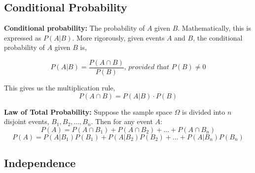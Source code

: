 \documentclass{article}
\begin{document}
\subsection{Conditional Probability}

\textbf{Conditional probability:} The probability of $A$ given $B$. Mathematically, this is expressed as $P(A|B)$. More rigorously, given events $A$ and $B$, the conditional probability of $A$ given $B$ is,

$$ P(A|B) = \frac{P(A \cap B)}{P(B)} \textit{, provided that } P(B) \neq 0$$

\noindent
This gives us the multiplication rule,
$$P(A \cap B) = P(A|B) \cdot P(B)$$


\noindent
\textbf{Law of Total Probability:} Suppose the sample space $\Omega$ is divided into $n$ disjoint events, $B_1, B_2, ..., B_n$. Then for any event $A$:
$$P(A) = P(A \cap B_1) + P(A \cap B_2) + ... + P(A \cap B_n) $$
$$P(A) = P(A|B_1)P(B_1) + P(A|B_2)P(B_2) + ... + P(A|B_n)P(B_n) $$


\subsection{Independence}
\end{document}
